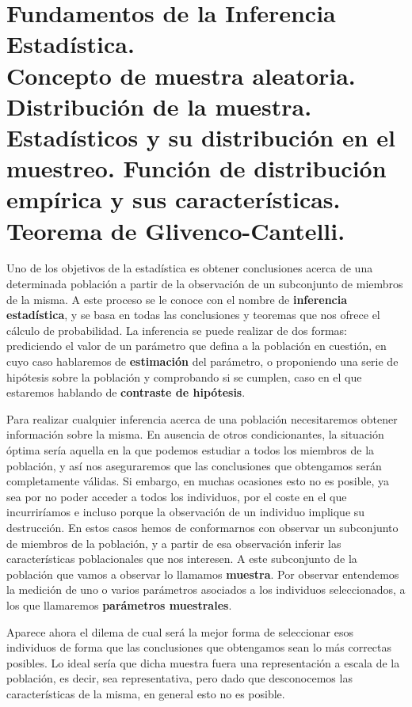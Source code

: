 \chapter[Fundamentos de la Inferencia Estad\'istica]{Fundamentos de la Inferencia Estad\'istica.\\
\normalsize Concepto de muestra aleatoria. Distribuci\'on de la muestra. Estad\'isticos y su distribuci\'on en el muestreo. Funci\'on de distribuci\'on emp\'irica y sus caracter\'isticas. Teorema de Glivenco-Cantelli.}


Uno de los objetivos de la estad\'istica es obtener conclusiones acerca de una determinada poblaci\'on a partir de la observaci\'on de un subconjunto de miembros de la misma. A este proceso se le conoce con el nombre de \textbf{inferencia estad\'istica}, y se basa en todas las conclusiones y teoremas que nos ofrece el c\'alculo de probabilidad. La inferencia se puede realizar de dos formas: prediciendo el valor de un par\'ametro que defina a la poblaci\'on en cuesti\'on, en cuyo caso hablaremos de \textbf{estimaci\'on} del par\'ametro, o proponiendo una serie de hip\'otesis sobre la poblaci\'on y comprobando si se cumplen, caso en el que estaremos hablando de \textbf{contraste de hip\'otesis}.


Para realizar cualquier inferencia acerca de una poblaci\'on necesitaremos obtener informaci\'on sobre la misma. En ausencia de otros condicionantes, la situaci\'on \'optima ser\'ia aquella en la que podemos estudiar a todos los miembros de la poblaci\'on, y as\'i nos aseguraremos que las conclusiones que obtengamos ser\'an completamente v\'alidas. Si embargo, en muchas ocasiones esto no es posible, ya sea por no poder acceder a todos los individuos, por el coste en el que incurrir\'iamos e incluso porque la observaci\'on de un individuo implique su destrucci\'on. En estos casos hemos de conformarnos con observar un subconjunto de miembros de la poblaci\'on, y a partir de esa observaci\'on inferir las caracter\'isticas poblacionales que nos interesen. A este subconjunto de la poblaci\'on que vamos a observar lo llamamos \textbf{muestra}. Por observar entendemos la medici\'on de uno o varios par\'ametros asociados a los individuos seleccionados, a los que llamaremos \textbf{par\'ametros muestrales}.

Aparece ahora el dilema de cual ser\'a la mejor forma de seleccionar esos individuos de forma que las conclusiones que obtengamos sean lo m\'as correctas posibles. Lo ideal ser\'ia que dicha muestra fuera una representaci\'on a escala de la poblaci\'on, es decir, sea representativa, pero dado que desconocemos las caracter\'isticas de la misma, en general esto no es posible.

